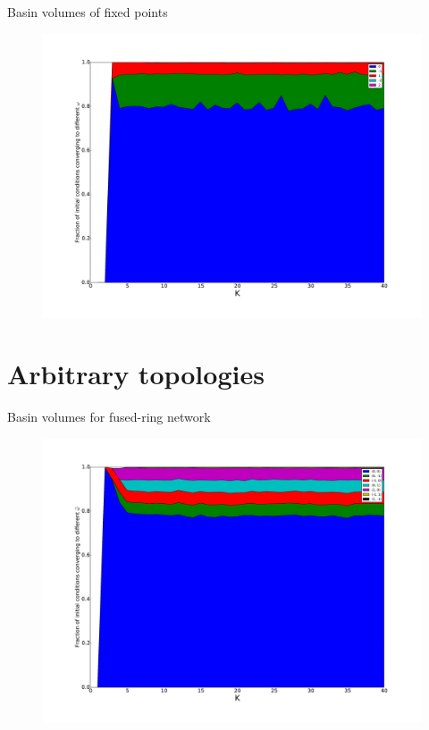 \documentclass[xcolor=x11names,compress]{beamer}
\renewcommand{\(}{\begin{columns}}
\renewcommand{\)}{\end{columns}}
\newcommand{\<}[1]{\begin{column}{#1}}
\renewcommand{\>}{\end{column}}
\begin{document}
\begin{frame}{Basin volumes of fixed points}
\begin{figure}
\begin{center}
\includegraphics[width=\columnwidth]{nrepeat_20000_P_3_N_16_normcond}
\end{center}
\end{figure}

\end{frame}




\section{Arbitrary topologies}
\begin{frame}{Basin volumes for fused-ring network}
\begin{figure}
\begin{center}
\includegraphics[width=\columnwidth]{nrepeat_20000_P_3_N_14_dualring}
\end{center}
\end{figure}

\end{frame}
\end{document}
